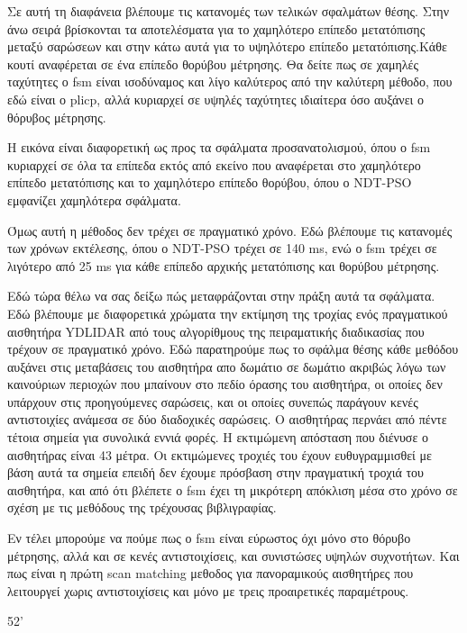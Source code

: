 \documentclass[a4paper,10pt]{article}
\begin{document}
Σε αυτή τη διαφάνεια βλέπουμε τις κατανομές των τελικών σφαλμάτων θέσης. Στην
άνω σειρά βρίσκονται τα αποτελέσματα για το χαμηλότερο επίπεδο μετατόπισης
μεταξύ σαρώσεων και στην κάτω αυτά για το υψηλότερο επίπεδο μετατόπισης.Κάθε
κουτί αναφέρεται σε ένα επίπεδο θορύβου μέτρησης. Θα δείτε πως σε χαμηλές
ταχύτητες ο fsm είναι ισοδύναμος και λίγο καλύτερος από την καλύτερη μέθοδο,
που εδώ είναι ο plicp, αλλά κυριαρχεί σε υψηλές ταχύτητες ιδιαίτερα όσο αυξάνει
ο θόρυβος μέτρησης.

Η εικόνα είναι διαφορετική ως προς τα σφάλματα προσανατολισμού, όπου ο fsm
κυριαρχεί σε όλα τα επίπεδα εκτός από εκείνο που αναφέρεται στο χαμηλότερο
επίπεδο μετατόπισης και το χαμηλότερο επίπεδο θορύβου, όπου ο NDT-PSO εμφανίζει
χαμηλότερα σφάλματα.

Όμως αυτή η μέθοδος δεν τρέχει σε πραγματικό χρόνο. Εδώ βλέπουμε τις κατανομές
των χρόνων εκτέλεσης, όπου ο NDT-PSO τρέχει σε 140 ms, ενώ ο fsm τρέχει σε
λιγότερο από 25 ms για κάθε επίπεδο αρχικής μετατόπισης και θορύβου μέτρησης.

Εδώ τώρα θέλω να σας δείξω πώς μεταφράζονται στην πράξη αυτά τα σφάλματα. Εδώ
βλέπουμε με διαφορετικά χρώματα την εκτίμηση της τροχίας ενός πραγματικού
αισθητήρα YDLIDAR από τους αλγορίθμους της πειραματικής διαδικασίας που τρέχουν
σε πραγματικό χρόνο. Εδώ παρατηρούμε πως το σφάλμα θέσης κάθε μεθόδου αυξάνει
στις μεταβάσεις του αισθητήρα απο δωμάτιο σε δωμάτιο ακριβώς λόγω των
καινούριων περιοχών που μπαίνουν στο πεδίο όρασης του αισθητήρα, οι οποίες δεν
υπάρχουν στις προηγούμενες σαρώσεις, και οι οποίες συνεπώς παράγουν κενές
αντιστοιχίες ανάμεσα σε δύο διαδοχικές σαρώσεις.  Ο αισθητήρας περνάει από
πέντε τέτοια σημεία για συνολικά εννιά φορές. Η εκτιμώμενη απόσταση που διένυσε
ο αισθητήρας είναι 43 μέτρα. Οι εκτιμώμενες τροχιές του έχουν ευθυγραμμισθεί με
βάση αυτά τα σημεία επειδή δεν έχουμε πρόσβαση στην πραγματική τροχιά του
αισθητήρα, και από ότι βλέπετε ο fsm έχει τη μικρότερη απόκλιση μέσα στο χρόνο
σε σχέση με τις μεθόδους της τρέχουσας βιβλιγραφίας.

Εν τέλει μπορούμε να πούμε πως ο fsm είναι εύρωστος όχι μόνο στο θόρυβο
μέτρησης, αλλά και σε κενές αντιστοιχίσεις, και συνιστώσες υψηλών συχνοτήτων.
Και πως είναι η πρώτη scan matching μεθοδος για πανοραμικούς αισθητήρες
που λειτουργεί χωρις αντιστοιχίσεις και μόνο με τρεις προαιρετικές παραμέτρους.


52'
\end{document}
